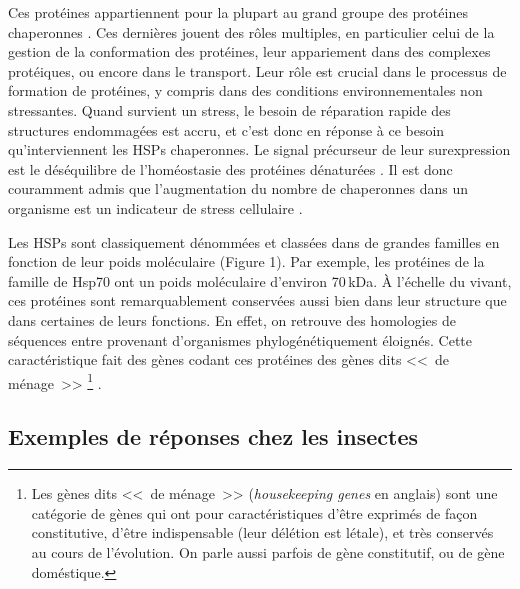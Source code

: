 	Ces protéines appartiennent pour la plupart au grand groupe des protéines chaperonnes \cite{federhoffmann1999}.
	Ces dernières jouent des rôles multiples, en particulier celui de la gestion de la conformation des protéines, leur appariement dans des complexes protéiques, ou encore dans le transport.
	Leur rôle est crucial dans le processus de formation de protéines, y compris dans des conditions environnementales non stressantes.
	Quand survient un stress, le besoin de réparation rapide des structures endommagées est accru, et c'est donc en réponse à ce besoin qu'interviennent les HSPs chaperonnes.
	Le signal précurseur de leur surexpression est le déséquilibre de l'homéostasie des protéines dénaturées \cite{ananthan1986}.
	Il est donc couramment admis que l'augmentation du nombre de chaperonnes dans un organisme est un indicateur de stress cellulaire \cite{ryan1996}.

	Les HSPs sont classiquement dénommées et classées dans de grandes familles en fonction de leur poids moléculaire (Figure 1).
	Par exemple, les protéines de la famille de Hsp70 ont un poids moléculaire d'environ 70\,kDa.
	À l'échelle du vivant, ces protéines sont remarquablement conservées aussi bien dans leur structure que dans certaines de leurs fonctions.
	En effet, on retrouve des homologies de séquences entre provenant d’organismes phylogénétiquement éloignés.
	Cette caractéristique fait des gènes codant ces protéines des gènes dits <<~de ménage~>>%
\footnote{Les gènes dits <<~de ménage~>> (\textit{housekeeping genes} en anglais) sont une catégorie de gènes qui ont pour caractéristiques d'être exprimés de façon constitutive, d'être indispensable (leur délétion est létale), et très conservés au cours de l'évolution. On parle aussi parfois de gène constitutif, ou de gène doméstique.} \cite{gupta1995}.



	\subsection{Exemples de réponses chez les insectes}

